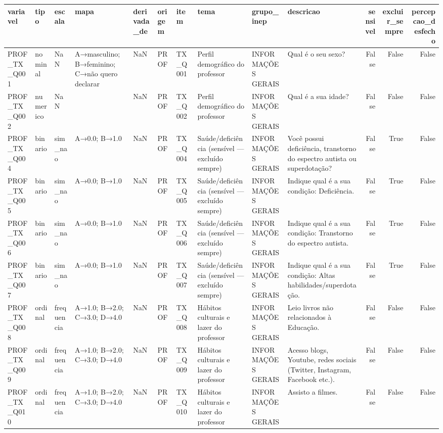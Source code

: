\begin{tabular}{llllllllllrrr}
\toprule
variavel & tipo & escala & mapa & derivada\_de & origem & item & tema & grupo\_inep & descricao & sensivel & excluir\_sempre & percepcao\_desfecho \\
\midrule
PROF\_TX\_Q001 & nominal & NaN & A→masculino; B→feminino; C→não quero declarar & NaN & PROF & TX\_Q001 & Perfil demográfico do professor & INFORMAÇÕES GERAIS & Qual é o seu sexo? & False & False & False \\
PROF\_TX\_Q002 & numerico & NaN &  & NaN & PROF & TX\_Q002 & Perfil demográfico do professor & INFORMAÇÕES GERAIS & Qual é a sua idade? & False & False & False \\
PROF\_TX\_Q004 & binario & sim\_nao & A→0.0; B→1.0 & NaN & PROF & TX\_Q004 & Saúde/deficiência (sensível — excluído sempre) & INFORMAÇÕES GERAIS & Você possui deficiência, transtorno do espectro autista ou superdotação? & False & True & False \\
PROF\_TX\_Q005 & binario & sim\_nao & A→0.0; B→1.0 & NaN & PROF & TX\_Q005 & Saúde/deficiência (sensível — excluído sempre) & INFORMAÇÕES GERAIS & Indique qual é a sua condição:  Deficiência. & False & True & False \\
PROF\_TX\_Q006 & binario & sim\_nao & A→0.0; B→1.0 & NaN & PROF & TX\_Q006 & Saúde/deficiência (sensível — excluído sempre) & INFORMAÇÕES GERAIS & Indique qual é a sua condição: Transtorno do espectro autista. & False & True & False \\
PROF\_TX\_Q007 & binario & sim\_nao & A→0.0; B→1.0 & NaN & PROF & TX\_Q007 & Saúde/deficiência (sensível — excluído sempre) & INFORMAÇÕES GERAIS & Indique qual é a sua condição: Altas habilidades/superdotação. & False & True & False \\
PROF\_TX\_Q008 & ordinal & frequencia & A→1.0; B→2.0; C→3.0; D→4.0 & NaN & PROF & TX\_Q008 & Hábitos culturais e lazer do professor & INFORMAÇÕES GERAIS & Leio livros não relacionados à Educação. & False & False & False \\
PROF\_TX\_Q009 & ordinal & frequencia & A→1.0; B→2.0; C→3.0; D→4.0 & NaN & PROF & TX\_Q009 & Hábitos culturais e lazer do professor & INFORMAÇÕES GERAIS & Acesso blogs, Youtube, redes sociais (Twitter, Instagram, Facebook etc.). & False & False & False \\
PROF\_TX\_Q010 & ordinal & frequencia & A→1.0; B→2.0; C→3.0; D→4.0 & NaN & PROF & TX\_Q010 & Hábitos culturais e lazer do professor & INFORMAÇÕES GERAIS & Assisto a filmes. & False & False & False \\

\end{tabular}
